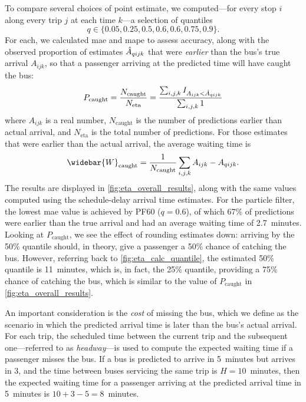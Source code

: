 To compare several choices of point estimate, we computed---for every stop $i$ along every trip $j$ at each time $k$---a selection of quantiles
\[
  q \in \{0.05, 0.25, 0.5, 0.6, 0.6, 0.75, 0.9\}.
\]
For each, we calculated \gls{mae} and \gls{mape} to assess accuracy, along with the observed proportion of estimates $\hat{A}_{qijk}$ that were \emph{earlier} than the bus's true arrival $A_{ijk}$, so that a passenger arriving at the predicted time will have caught the bus:
\begin{equation}
\label{eq:pr_bus_caught}
P_\text{caught} = \frac{N_\text{caught}}{N_\text{eta}}
= \frac{\sum_{i,j,k} I_{A_{ijk} < \hat{A}_{qijk}}}{\sum_{i,j,k} 1}
\end{equation}
where $A_{ijk}$ is a real number, $N_\text{caught}$ is the number of predictions earlier than actual arrival, and $N_\text{eta}$ is the total number of predictions. For those estimates that were earlier than the actual arrival, the average waiting time is
\begin{equation}
\label{eq:avg_wait_time}
\widebar{W}_\text{caught} =
\frac{1}{N_\text{caught}} \sum_{i,j,k} A_{ijk} - \Teta_{qijk}.
\end{equation}
The results are displayed in \cref{fig:eta_overall_results}, along with the same values computed using the schedule-delay arrival time estimates. For the particle filter, the lowest \gls{mae} value is achieved by PF60 ($q = 0.6$), of which 67\% of predictions were earlier than the true arrival and had an average waiting time of 2.7~minutes. Looking at $P_\text{caught}$, we see the effect of rounding estimates down: arriving by the 50\% quantile should, in theory, give a passenger a 50\% chance of catching the bus. However, referring back to \cref{fig:eta_calc_quantile}, the estimated 50\% quantile is 11~minutes, which is, in fact, the 25\% quantile, providing a 75\% chance of catching the bus, which is similar to the value of $P_\text{caught}$ in \cref{fig:eta_overall_results}.



An important consideration is the \emph{cost} of missing the bus, which we define as the scenario in which the predicted arrival time is later than the bus's actual arrival. For each trip, the scheduled time between the current trip and the subsequent one---referred to as \emph{headway}---is used to compute the expected waiting time if a passenger misses the bus. If a bus is predicted to arrive in 5~minutes but arrives in 3, and the time between buses servicing the same trip is $H = 10$~minutes, then the expected waiting time for a passenger arriving at the predicted arrival time in 5~minutes is $10+3-5=8$~minutes.


